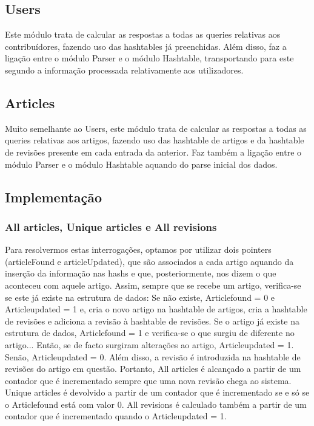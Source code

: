 \documentclass[a4paper]{article}
\begin{document}
\subsection{Users}
 Este módulo trata de calcular as respostas a todas as queries relativas aos contribuídores, fazendo uso das hashtables já preenchidas. Além disso, faz a ligação entre o módulo Parser e o módulo Hashtable, transportando para este segundo a informação processada relativamente aos utilizadores.

\subsection{Articles}
 Muito semelhante ao Users, este módulo trata de calcular as respostas a todas as queries relativas aos artigos, fazendo uso das hashtable de artigos e da hashtable de revisões presente em cada entrada da anterior. Faz também a ligação entre o módulo Parser e o módulo Hashtable aquando do parse inicial dos dados.

\subsection{Implementação}

\subsubsection{All articles, Unique articles e All revisions}
Para resolvermos estas interrogações, optamos por utilizar dois pointers (articleFound e articleUpdated), que são associados a cada artigo aquando da inserção da informação nas hashs e que, posteriormente, nos dizem o que aconteceu com aquele artigo.
Assim, sempre que se recebe um artigo, verifica-se se este já existe na estrutura de dados:
Se não existe, Articlefound = 0 e Articleupdated = 1 e, cria o novo artigo na hashtable de artigos, cria a hashtable de revisões e adiciona a revisão à hashtable de revisões.
Se o artigo já existe na estrutura de dados, Articlefound = 1 e verifica-se o que surgiu de diferente no artigo... Então, se de facto surgiram alterações ao artigo, Articleupdated = 1. Senão, Articleupdated = 0. Além disso, a revisão é introduzida na hashtable de revisões do artigo em questão.
Portanto, All articles é alcançado a partir de um contador que é incrementado sempre que uma nova revisão chega ao sistema. Unique articles é devolvido a partir de um contador que é incrementado se e só se o Articlefound está com valor 0. All revisions é calculado também a partir de um contador que é incrementado quando o Articleupdated = 1.
\end{document}
